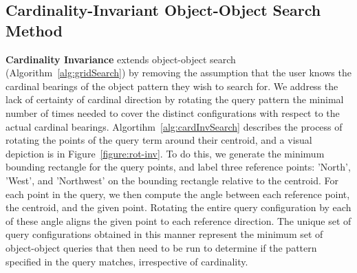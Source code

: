 \subsection{Cardinality-Invariant Object-Object Search Method}
\textbf{Cardinality Invariance} extends object-object search (Algorithm~\ref{alg:gridSearch}) by removing the assumption that the user knows the cardinal bearings of the object pattern they wish to search for. 
We address the lack of certainty of cardinal direction by rotating the query pattern the minimal number of times needed to cover the distinct configurations with respect to the actual cardinal bearings. 
Algortihm~\ref{alg:cardInvSearch} describes the process of rotating the points of the query term around their centroid, and a visual depiction is in Figure~\ref{figure:rot-inv}.
To do this, we generate the minimum bounding rectangle for the query points, and label three reference points: 'North', 'West', and 'Northwest' on the bounding rectangle relative to the centroid. 
For each point in the query, we then compute the angle between each reference point, the centroid, and the given point. 
Rotating the entire query configuration by each of these angle aligns the given point to each reference direction.
The unique set of query configurations obtained in this manner represent the minimum set of object-object queries that then need to be run to determine if the pattern specified in the query matches, irrespective of cardinality. 

